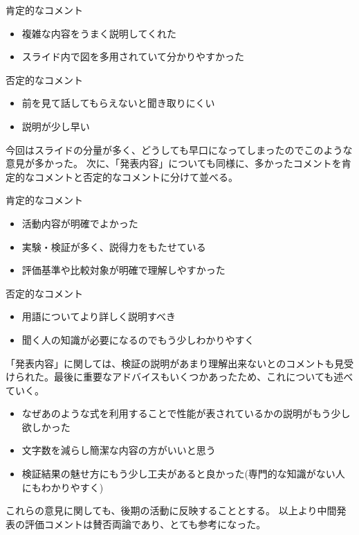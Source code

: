 肯定的なコメント
\begin{itemize}
\item 複雑な内容をうまく説明してくれた
\item スライド内で図を多用されていて分かりやすかった
\end{itemize}

否定的なコメント
\begin{itemize}
\item 前を見て話してもらえないと聞き取りにくい
\item 説明が少し早い
\end{itemize}

今回はスライドの分量が多く、どうしても早口になってしまったのでこのような意見が多かった。
次に、「発表内容」についても同様に、多かったコメントを肯定的なコメントと否定的なコメントに分けて並べる。

肯定的なコメント
\begin{itemize}
\item 活動内容が明確でよかった
\item 実験・検証が多く、説得力をもたせている
\item 評価基準や比較対象が明確で理解しやすかった
\end{itemize}

否定的なコメント
\begin{itemize}
\item 用語についてより詳しく説明すべき
\item 聞く人の知識が必要になるのでもう少しわかりやすく
\end{itemize}


「発表内容」に関しては、検証の説明があまり理解出来ないとのコメントも見受けられた。最後に重要なアドバイスもいくつかあったため、これについても述べていく。　
\begin{itemize}
\item なぜあのような式を利用することで性能が表されているかの説明がもう少し欲しかった
\item 文字数を減らし簡潔な内容の方がいいと思う
\item 検証結果の魅せ方にもう少し工夫があると良かった(専門的な知識がない人にもわかりやすく)
\end{itemize}
これらの意見に関しても、後期の活動に反映することとする。
以上より中間発表の評価コメントは賛否両論であり、とても参考になった。
